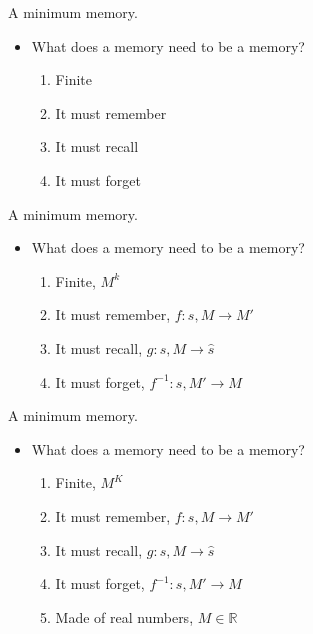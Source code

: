 \documentclass[10pt]{beamer}
\begin{document}
\begin{frame}[fragile]{A minimum memory.}
\begin{itemize}
    \item What does a memory need to be a memory?
    \begin{enumerate}
        \item Finite
        \item It must remember
        \item It must recall
        \item It must forget
    \end{enumerate}
\end{itemize}
\end{frame}

\begin{frame}[fragile]{A minimum memory.}
\begin{itemize}
    \item What does a memory need to be a memory?
    \begin{enumerate}
        \item Finite, $M^k$
        \item It must remember, $f : s, M \rightarrow M'$
        \item It must recall, $g : s, M \rightarrow \hat s$
        \item It must forget, $f^{-1} : s, M' \rightarrow M$
    \end{enumerate}
\end{itemize}
\end{frame}

\begin{frame}[fragile]{A minimum memory.}
\begin{itemize}
    \item What does a memory need to be a memory?
    \begin{enumerate}
        \item Finite, $M^K$
        \item It must remember, $f : s, M \rightarrow M'$
        \item It must recall, $g : s, M \rightarrow \hat s$
        \item It must forget, $f^{-1} : s, M' \rightarrow M$
        \item Made of real numbers, $M \in \mathbb{R}$
    \end{enumerate}
\end{itemize}
\end{frame}
\end{document}
